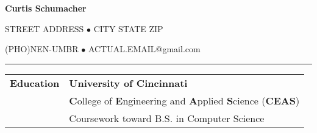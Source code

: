 \documentclass[11pt]{article} %
\begin{document}
	\huge{\centerline{\textbf{Curtis Schumacher}}}
	\large
	\centerline{STREET ADDRESS $\bullet$ CITY STATE ZIP}
	\centerline{(PHO)NEN-UMBR $\bullet$ ACTUAL.EMAIL@gmail.com}
	\vspace*{.75\baselineskip}\hrule\vspace*{1\baselineskip}
\begin{small}	
	\begin{tabular}[t]{p{3cm} p{16cm}}\large{\textbf{Education}}
    				& \textbf{University of Cincinnati} \color{gray}{Fall 2010 - Winter 2016}\\
    				& \textbf{C}ollege of \textbf{E}ngineering and \textbf{A}pplied \textbf{S}cience (\textbf{CEAS}) \\
    				& Coursework toward B.S. in Computer Science \\
			\end{tabular}
			

\end{small}
\end{document}
